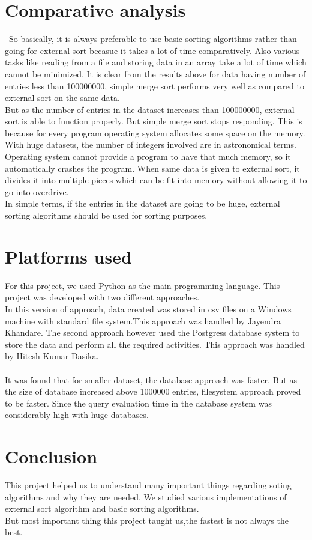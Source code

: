 \documentclass[12pt]{article}
\begin{document}
\section{Comparative analysis}\
So basically, it is always preferable to use basic sorting algorithms rather than going for external sort becasue it takes a lot of time comparatively. Also various tasks like reading from a file and storing data in an array take a lot of time which cannot be minimized. It is clear from the results above for data having number of entries less than 100000000,  simple merge sort performs very well as compared to external sort on the same data.\\
But as the number of entries in the dataset increases than 100000000, external sort is able to function properly. But simple merge sort stops responding. This is because for every program operating system allocates some space on the memory. With huge datasets, the number of integers involved are in astronomical terms. Operating system cannot provide a program to have that much memory, so it automatically crashes the program. When same data is given to external sort, it divides it into multiple pieces which can be fit into memory without allowing it to go into overdrive.\\
In simple terms, if the entries in the dataset are going to be huge, external sorting algorithms should be used for sorting purposes.
 
\section{Platforms used}
For this project, we used Python as the main programming language. This project was developed with two different approaches.\\
In this version of approach, data created was stored in csv files on a Windows machine with standard file system.This approach was handled by Jayendra Khandare. The second approach however used the Postgress database system to store the data and perform all the required activities. This approach was handled by Hitesh Kumar Dasika. \\\\
It was found that for smaller dataset, the database approach was faster. But as the size of database increased above 1000000 entries, filesystem approach proved to be faster. Since the query evaluation time in the database system was considerably high with huge databases.

\section{Conclusion}
This project helped us to understand many important things regarding soting algorithms and why they are needed. We studied various implementations of external sort algorithm and basic sorting algorithms.\\
But most important thing this project taught us,the fastest is not always the best.\\ 
 
\end{document}
